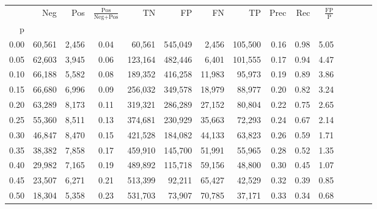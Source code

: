 \begin{tabular}{rrrcrrrrrrrrrrr}
\toprule
{} &     Neg &     Pos & $\frac{\text{Pos}}{\text{Neg}+\text{Pos}}$ &       TN &       FP &       FN &       TP &  Prec &   Rec & $\frac{\text{FP}}{\text{P}}$ \\
p    &         &         &                                            &          &          &          &          &       &       &                              \\
\midrule
0.00 &  60,561 &   2,456 &                                       0.04 &   60,561 &  545,049 &    2,456 &  105,500 &  0.16 &  0.98 &                         5.05 \\
0.05 &  62,603 &   3,945 &                                       0.06 &  123,164 &  482,446 &    6,401 &  101,555 &  0.17 &  0.94 &                         4.47 \\
0.10 &  66,188 &   5,582 &                                       0.08 &  189,352 &  416,258 &   11,983 &   95,973 &  0.19 &  0.89 &                         3.86 \\
0.15 &  66,680 &   6,996 &                                       0.09 &  256,032 &  349,578 &   18,979 &   88,977 &  0.20 &  0.82 &                         3.24 \\
0.20 &  63,289 &   8,173 &                                       0.11 &  319,321 &  286,289 &   27,152 &   80,804 &  0.22 &  0.75 &                         2.65 \\
0.25 &  55,360 &   8,511 &                                       0.13 &  374,681 &  230,929 &   35,663 &   72,293 &  0.24 &  0.67 &                         2.14 \\
0.30 &  46,847 &   8,470 &                                       0.15 &  421,528 &  184,082 &   44,133 &   63,823 &  0.26 &  0.59 &                         1.71 \\
0.35 &  38,382 &   7,858 &                                       0.17 &  459,910 &  145,700 &   51,991 &   55,965 &  0.28 &  0.52 &                         1.35 \\
0.40 &  29,982 &   7,165 &                                       0.19 &  489,892 &  115,718 &   59,156 &   48,800 &  0.30 &  0.45 &                         1.07 \\
0.45 &  23,507 &   6,271 &                                       0.21 &  513,399 &   92,211 &   65,427 &   42,529 &  0.32 &  0.39 &                         0.85 \\
0.50 &  18,304 &   5,358 &                                       0.23 &  531,703 &   73,907 &   70,785 &   37,171 &  0.33 &  0.34 &                         0.68 \\

\end{tabular}
